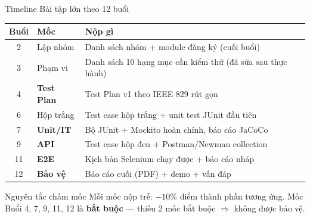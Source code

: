 \documentclass[aspectratio=169,12pt]{beamer}
\begin{document}
\begin{frame}{Timeline Bài tập lớn theo 12 buổi}
  \begin{center}
  \scriptsize
  \setlength{\tabcolsep}{4pt}
  \begin{tabular}{cl>{\raggedright\arraybackslash}p{7.2cm}}
    \toprule
    \textbf{Buổi} & \textbf{Mốc} & \textbf{Nộp gì} \\
    \midrule
    2  & Lập nhóm     & Danh sách nhóm + module đăng ký (cuối buổi) \\
    3  & Phạm vi      & Danh sách 10 hạng mục cần kiểm thử (đã sửa sau thực hành) \\
    4  & \textbf{Test Plan} & Test Plan v1 theo IEEE 829 rút gọn \\
    6  & Hộp trắng    & Test case hộp trắng + unit test JUnit đầu tiên \\
    7  & \textbf{Unit/IT}  & Bộ JUnit + Mockito hoàn chỉnh, báo cáo JaCoCo \\
    9  & \textbf{API} & Test case hộp đen + Postman/Newman collection \\
    11 & \textbf{E2E} & Kịch bản Selenium chạy được + báo cáo nháp \\
    12 & \textbf{Bảo vệ} & Báo cáo cuối (PDF) + demo + vấn đáp \\
    \bottomrule
  \end{tabular}
  \end{center}

  \vspace{0.2em}
  \begin{alertblock}{Nguyên tắc chấm mốc}
    \small Mỗi mốc nộp trễ: $-10\%$ điểm thành phần tương ứng. Mốc Buổi 4, 7, 9, 11, 12
    là \textbf{bắt buộc} --- thiếu 2 mốc bắt buộc $\Rightarrow$ không được bảo vệ.
  \end{alertblock}
\end{frame}
\end{document}
